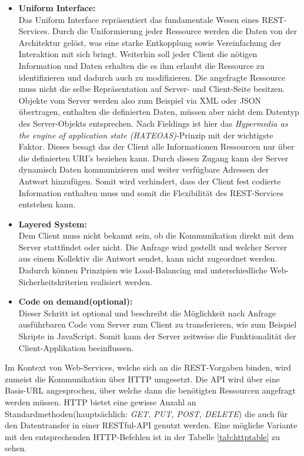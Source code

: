 \documentclass[fleqn,10pt,ngerman]{SelfArx}
\begin{document}
\begin{itemize}
	\item \textbf{Uniform Interface:}\\ Das Uniform Interface repräsentiert das fundamentale Wesen eines REST-Services. Durch die Uniformierung jeder Ressource werden die Daten von der Architektur gelöst, was eine starke Entkopplung sowie Vereinfachung der Interaktion mit sich bringt. Weiterhin soll jeder Client die nötigen Information und Daten erhalten die es ihm erlaubt die Ressource zu identifizieren und dadurch auch zu modifizieren. Die angefragte Ressource muss nicht die selbe Repräsentation auf Server- und Client-Seite besitzen. Objekte vom Server werden also zum Beispiel via XML oder JSON übertragen, enthalten die definierten Daten, müssen aber nicht dem Datentyp des Server-Objekts entsprechen. Nach Fieldings ist hier das \textit{Hypermedia as the engine of application state (HATEOAS)}-Prinzip mit der wichtigste Faktor. Dieses besagt das der Client alle Informationen Ressourcen nur über die definierten URI's beziehen kann. Durch diesen Zugang kann der Server dynamisch Daten kommunizieren und weiter verfügbare Adressen der Antwort hinzufügen. Somit wird verhindert, dass der Client fest codierte Information enthalten muss und somit die Flexibilität des REST-Services entstehen kann.
	\item \textbf{Layered System:}\\ Dem Client muss nicht bekannt sein, ob die Kommunikation direkt mit dem Server stattfindet oder nicht. Die Anfrage wird gestellt und welcher Server aus einem Kollektiv die Antwort sendet, kann nicht zugeordnet werden. Dadurch können Prinzipien wie Load-Balancing und unterschiedliche Web-Sicherheitskriterien realisiert werden. 
	\item \textbf{Code on demand(optional):}\\ Dieser Schritt ist optional und beschreibt die Möglichkeit nach Anfrage ausführbaren Code vom Server zum Client zu transferieren, wie zum Beispiel Skripte in JavaScript. Somit kann der Server zeitweise die Funktionalität der Client-Applikation beeinflussen.
\end{itemize} 
Im Kontext von Web-Services, welche sich an die REST-Vorgaben binden, wird zumeist die Kommunikation über HTTP umgesetzt. Die API wird über eine Basis-URL angesprochen, über welche dann die benötigten Ressourcen angefragt werden müssen. HTTP bietet eine gewisse Anzahl an Standardmethoden(hauptsächlich: \textit{GET, PUT, POST, DELETE}) die auch für den Datentransfer in einer RESTful-API genutzt werden. Eine mögliche Variante mit den entsprechenden HTTP-Befehlen ist in der Tabelle \ref{tab:httptable} zu sehen.
\end{document}
